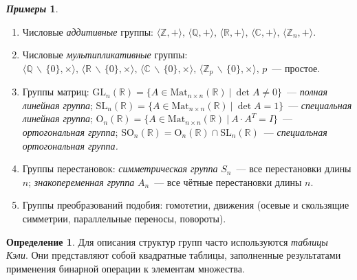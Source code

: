 \documentclass[a4paper, 14pt]{extarticle}
\newcommand{\integers}{\mathbb{Z}}
\newcommand{\rationals}{\mathbb{Q}}
\newcommand{\real}{\mathbb{R}}
\newcommand{\complex}{\mathbb{C}}
\newcommand{\GL}{\mathrm{GL}}
\newcommand{\SL}{\mathrm{SL}}
\newcommand{\Orth}{\mathrm{O}}
\newcommand{\SOrth}{\mathrm{SO}}
\theoremstyle{definition}
\newtheorem*{exmpls}{\textit{Примеры}}
\newtheorem{definition}{Определение}
\theoremstyle{plain}
\numberwithin{theorem}{section}
\numberwithin{definition}{section}
\numberwithin{statement}{section}
\numberwithin{lemma}{section}
\numberwithin{consequence}{section}
\begin{document}
	\begin{exmpls}
		\
		\begin{enumerate}
			\setlength\itemsep{0.1em}
			\item Числовые \textit{аддитивные} группы: \newline
			$\langle \integers, + \rangle, \, \langle \rationals, + \rangle, \, 
			\langle \real, + \rangle, \,
			\langle \complex, + \rangle, \, 
			\langle \integers_n, + \rangle.$ 
			\item Числовые \textit{мультипликативные} группы: \newline
			$\langle \rationals \, \backslash \, \{0\}, \times \rangle, \,
			\langle \real \, \backslash \, \{0\}, \times \rangle, \,
			\langle \complex \, \backslash \, \{0\}, \times \rangle, \,
			\langle \integers_p \, \backslash \, \{0\}, \times \rangle, \, p$~--- простое.
			\item Группы матриц: \newline
			${\GL_n(\real) = \{A \in \mathrm{Mat}_{n \times n}(\real) \ | \ \det A \neq 0 \}}$~--- \textit{полная линейная группа}; \newline
			${\SL_n(\real) = \{A \in \mathrm{Mat}_{n \times n}(\real) \ | \ \det A = 1 \}}$~--- \textit{специальная линейная
				группа}; \newline
			${\Orth_n(\real)} = \{A \in \mathrm{Mat}_{n \times n}(\real) \ | \ A \cdot A^T = I\}$~--- \textit{ортогональная группа}; \newline
			${\SOrth_n(\real) = \Orth_n(\real) \cap \SL_n(\real)}$~--- \textit{специальная ортогональная группа.}
			\item Группы перестановок: \newline
			\textit{симметрическая группа} $S_n$~--- все перестановки длины $n$;\newline
			\textit{знакопеременная группа} $A_n$~--- все чётные перестановки длины $n$.
			\item Группы преобразований подобия: гомотетии, движения (осевые и скользящие симметрии, параллельные переносы, повороты).
		\end{enumerate}
	\end{exmpls}
	\begin{definition}
		Для описания структур групп часто используются \textit{таблицы Кэли}. Они представляют собой квадратные таблицы, заполненные результатами применения бинарной операции к элементам множества.
	\end{definition}
\end{document}
